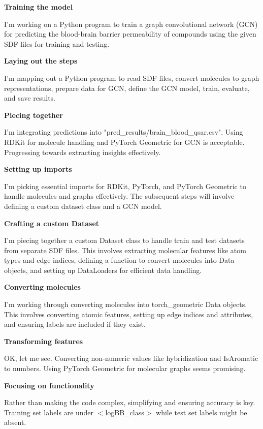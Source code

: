 \begin{tcolorbox}[title=Task: Train a graph convolutional network on the given dataset to predict the blood-brain barrier permeability of compounds.]
\small
\textbf{Training the model}

I’m working on a Python program to train a graph convolutional network (GCN) for predicting the blood-brain barrier permeability of compounds using the given SDF files for training and testing.

\textbf{Laying out the steps}

I’m mapping out a Python program to read SDF files, convert molecules to graph representations, prepare data for GCN, define the GCN model, train, evaluate, and save results.

\textbf{Piecing together}

I'm integrating predictions into "pred\_results/brain\_blood\_qsar.csv". Using RDKit for molecule handling and PyTorch Geometric for GCN is acceptable. Progressing towards extracting insights effectively.

\textbf{Setting up imports}

I'm picking essential imports for RDKit, PyTorch, and PyTorch Geometric to handle molecules and graphs effectively. The subsequent steps will involve defining a custom dataset class and a GCN model.

\textbf{Crafting a custom Dataset}

I’m piecing together a custom Dataset class to handle train and test datasets from separate SDF files. This involves extracting molecular features like atom types and edge indices, defining a function to convert molecules into Data objects, and setting up DataLoaders for efficient data handling.

\textbf{Converting molecules}

I’m working through converting molecules into torch\_geometric Data objects. This involves converting atomic features, setting up edge indices and attributes, and ensuring labels are included if they exist.

\textbf{Transforming features}

OK, let me see. Converting non-numeric values like hybridization and IsAromatic to numbers. Using PyTorch Geometric for molecular graphs seems promising.

\textbf{Focusing on functionality}

Rather than making the code complex, simplifying and ensuring accuracy is key. Training set labels are under $<$logBB\_class$>$ while test set labels might be absent.


\end{tcolorbox}

